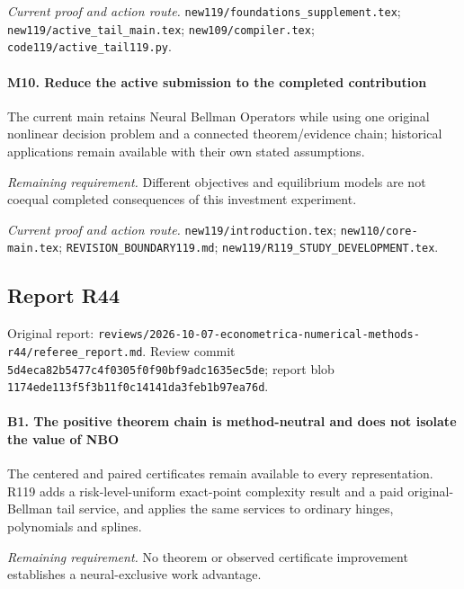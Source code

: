 \par\emph{Current proof and action route.} \nolinkurl{new119/foundations_supplement.tex}; \nolinkurl{new119/active_tail_main.tex}; \nolinkurl{new109/compiler.tex}; \nolinkurl{code119/active_tail119.py}.

\paragraph{M10. Reduce the active submission to the completed contribution}

The current main retains Neural Bellman Operators while using one original nonlinear decision problem and a connected theorem/\allowbreak{}evidence chain; historical applications remain available with their own stated assumptions.

\par\emph{Remaining requirement.} Different objectives and equilibrium models are not coequal completed consequences of this investment experiment.

\par\emph{Current proof and action route.} \nolinkurl{new119/introduction.tex}; \nolinkurl{new110/core-main.tex}; \nolinkurl{REVISION_BOUNDARY119.md}; \nolinkurl{new119/R119_STUDY_DEVELOPMENT.tex}.

\subsection{Report R44}

Original report: \nolinkurl{reviews/2026-10-07-econometrica-numerical-methods-r44/referee_report.md}. Review commit \nolinkurl{5d4eca82b5477c4f0305f0f90bf9adc1635ec5de}; report blob \nolinkurl{1174ede113f5f3b11f0c14141da3feb1b97ea76d}.

\paragraph{B1. The positive theorem chain is method-neutral and does not isolate the value of NBO}

The centered and paired certificates remain available to every representation. R119 adds a risk-level-uniform exact-point complexity result and a paid original-Bellman tail service, and applies the same services to ordinary hinges, polynomials and splines.

\par\emph{Remaining requirement.} No theorem or observed certificate improvement establishes a neural-exclusive work advantage.

